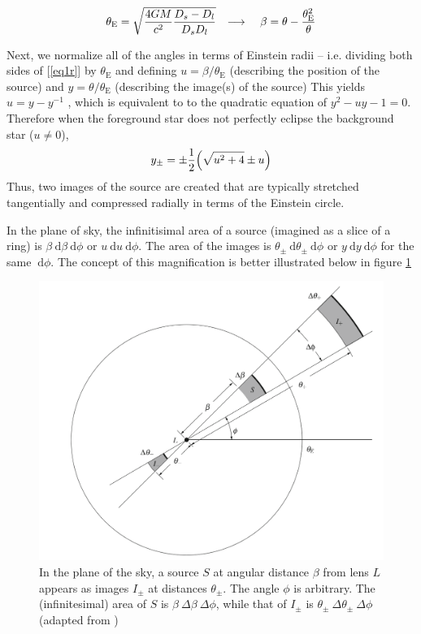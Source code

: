 \documentclass[12pt, a4paper]{article}
\newcommand{\arr}{\ensuremath{\longrightarrow\ }}
\begin{document}
\begin{equation}
\theta _\mathrm E =
\sqrt{\frac{4GM}{c^2}\frac{D_s-D_l}{D_sD_l}}
\qq{\arr} \beta = \theta - \frac{\theta _\mathrm E^2}{\theta}
\end{equation}

Next, we normalize all of the angles in terms of Einstein radii -- i.e. dividing both sides of [\ref{eq1r}] by $\theta _\mathrm E$
and defining 
$u=\beta /\theta _\mathrm E$ (describing the position of the source)
and $y=\theta /\theta _\mathrm E$ (describing the image(s) of the source)
This yields
$u=y-y^{-1}$
, which is equivalent to to the quadratic equation of
$y^2-uy-1=0$.
Therefore when the foreground star does not perfectly eclipse the background star ($u\neq 0$),
\[y_\pm = \pm \frac12\pqty{\sqrt{u^2+4}\pm u}\]
Thus, two images of the source are created that are typically stretched tangentially and compressed radially
\cite{gaudi} in terms of the Einstein circle.

In the plane of sky, the infinitisimal area of a source (imagined as a slice of a ring) is $\beta \ \mathrm d \beta \ \mathrm d \phi$ or $u \ \mathrm d u \ \mathrm d \phi$.
The area of the images is $\theta _\pm \ \mathrm d \theta _\pm \ \mathrm d \phi$ or $y \ \mathrm d y \ \mathrm d \phi$
for the same $ \ \mathrm d \phi$.\cite{gl_princ}
The concept of this magnification is better illustrated below in figure \ref{fig:symb_mag}

\begin{figure}[H]
\centering
\includegraphics[width=12cm]{symb_mag}
\caption{
 In the plane of the sky, a source $S$ at angular distance
$\beta$ from lens $L$ appears as images $I_\pm$ at distances
$\theta _\pm$.
The angle $\phi$ is arbitrary.
The (infinitesimal) area of $S$ is $\beta\ \Delta \beta\ \Delta \phi$,
while that of $I_\pm$ is $\theta_\pm\ \Delta \theta _\pm \ \Delta \phi$
(adapted from \cite{gl_princ})
  }
\label{fig:symb_mag}
\end{figure}
\end{document}
